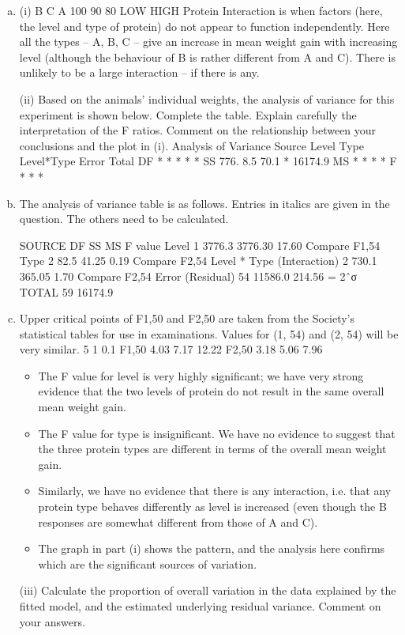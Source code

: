 \documentclass[a4paper,12pt]{article}
\begin{document}
\begin{enumerate}[(a)]
\item (i)
B
C
A
100
90
80
LOW
HIGH
Protein
Interaction is when factors (here, the level and type of protein) do not appear to function independently. Here all the types – A, B, C – give an increase in mean weight gain with increasing level (although the behaviour of B is rather different from A and C). There is unlikely to be a large interaction – if there is any.


\newpage
\begin{framed}
(ii) Based on the animals' individual weights, the analysis of variance for this
experiment is shown below. Complete the table. Explain carefully the
interpretation of the F ratios. Comment on the relationship between your
conclusions and the plot in (i).
Analysis of Variance
Source
Level
Type
Level*Type
Error
Total
DF
*
*
*
*
*
SS
776.
8.5
70.1
*
16174.9
MS
*
*
*
*
F
*
*
*


\end{framed}
\item  The analysis of variance table is as follows. Entries in italics are given in the question. The others need to be calculated.

SOURCE
DF
SS
MS
F value
Level
1
3776.3
3776.30
17.60 Compare F1,54
Type
2
82.5
41.25
0.19 Compare F2,54
Level * Type (Interaction)
2
730.1
365.05
1.70 Compare F2,54
Error (Residual)
54
11586.0
214.56
= 2ˆσ
TOTAL
59
16174.9

\item Upper critical points of F1,50 and F2,50 are taken from the Society's statistical tables for use in examinations. Values for (1, 54) and (2, 54) will be very similar.
5%
1%
0.1%
F1,50
4.03
7.17
12.22
F2,50
3.18
5.06
7.96

\begin{itemize}
\item The F value for level is very highly significant; we have very strong evidence that the two levels of protein do not result in the same overall mean weight gain.
\item The F value for type is insignificant. We have no evidence to suggest that the three protein types are different in terms of the overall mean weight gain.
\item Similarly, we have no evidence that there is any interaction, i.e. that any protein type behaves differently as level is increased (even though the B responses are somewhat different from those of A and C). 
\item The graph in part (i) shows the pattern, and the analysis here confirms which are the significant sources of variation.
\end{itemize}
\newpage
\begin{framed}
\large
(iii)
Calculate the proportion of overall variation in the data explained by the fitted
model, and the estimated underlying residual variance. Comment on your
answers.


\end{framed}
\end{enumerate}
\end{document}

